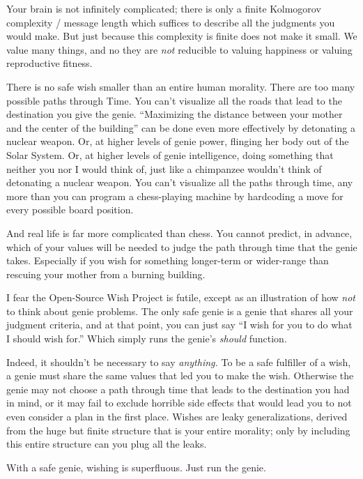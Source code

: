 {
 Your brain is not infinitely complicated; there is only a finite
Kolmogorov complexity / message length which suffices to describe all
the judgments you would make. But just because this complexity is
finite does not make it small. We value many things, and no they are
\textit{not} reducible to valuing happiness or valuing reproductive
fitness.}

{
 There is no safe wish smaller than an entire human morality. There
are too many possible paths through Time. You can't
visualize all the roads that lead to the destination you give the
genie. ``Maximizing the distance between your mother
and the center of the building'' can be done even
more effectively by detonating a nuclear weapon. Or, at higher levels
of genie power, flinging her body out of the Solar System. Or, at
higher levels of genie intelligence, doing something that neither you
nor I would think of, just like a chimpanzee wouldn't
think of detonating a nuclear weapon. You can't
visualize all the paths through time, any more than you can program a
chess-playing machine by hardcoding a move for every possible board
position.}

{
 And real life is far more complicated than chess. You cannot
predict, in advance, which of your values will be needed to judge the
path through time that the genie takes. Especially if you wish for
something longer-term or wider-range than rescuing your mother from a
burning building.}

{
 I fear the Open-Source Wish Project is futile, except as an
illustration of how \textit{not} to think about genie problems. The
only safe genie is a genie that shares all your judgment criteria, and
at that point, you can just say ``I wish for you to do
what I should wish for.'' Which simply runs the
genie's \textit{should} function.}

{
 Indeed, it shouldn't be necessary to say
\textit{anything.} To be a safe fulfiller of a wish, a genie must share
the same values that led you to make the wish. Otherwise the genie may
not choose a path through time that leads to the destination you had in
mind, or it may fail to exclude horrible side effects that would lead
you to not even consider a plan in the first place. Wishes are leaky
generalizations, derived from the huge but finite structure that is
your entire morality; only by including this entire structure can you
plug all the leaks.}

{
 With a safe genie, wishing is superfluous. Just run the genie.}

{\centering
 \ ~
\par}


